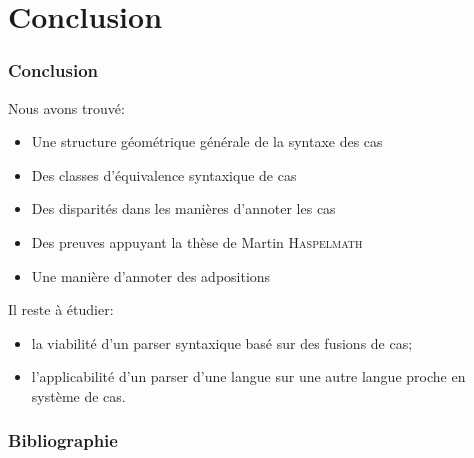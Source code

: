 \documentclass[noamsthm]{beamercours}
\begin{document}
\section{Conclusion}

\begin{frame}
	\frametitle{Conclusion}
	Nous avons trouvé:
	\begin{itemize}
		\item Une structure géométrique générale de la syntaxe des cas
		\item Des classes d'équivalence syntaxique de cas
		\item Des disparités dans les manières d'annoter les cas
		\item Des preuves appuyant la thèse de Martin \textsc{Haspelmath}
		\item Une manière d'annoter des adpositions
	\end{itemize}
	Il reste à étudier:
	\begin{itemize}
		\item la viabilité d'un parser syntaxique basé sur des fusions de cas;
		\item l'applicabilité d'un parser d'une langue sur une autre langue proche en système de cas.
	\end{itemize}
\end{frame}

\begin{frame}[t, allowframebreaks]
	\frametitle{Bibliographie}
	
	
\end{frame}
\end{document}
